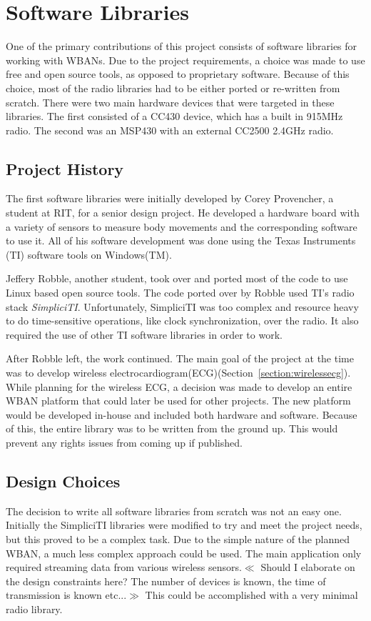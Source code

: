 \documentclass{article}
\begin{document}
\section{Software Libraries}\label{sec:wbansoftwarelib}
One of the primary contributions of this project consists of software libraries for working with WBANs. Due to the project requirements, a choice was made to use free and open source tools, as opposed to proprietary software. Because of this choice, most of the radio libraries had to be either ported or re-written from scratch. There were two main hardware devices that were targeted in these libraries. The first consisted of a CC430 device, which has a built in 915MHz radio. The second was an MSP430 with an external CC2500 2.4GHz radio.

\subsection{Project History}
The first software libraries were initially developed by Corey Provencher, a student at RIT, for a senior design project. He developed a hardware board with a variety of sensors to measure body movements and the corresponding software to use it. All of his software development was done using the Texas Instruments (TI) software tools on Windows(TM).

Jeffery Robble, another student, took over and ported most of the code to use Linux based open source tools. The code ported over by Robble used TI's radio stack \emph{SimpliciTI}. Unfortunately, SimpliciTI was too complex and resource heavy to do time-sensitive operations, like clock synchronization, over the radio. It also required the use of other TI software libraries in order to work.

After Robble left, the work continued. The main goal of the project at the time was to develop wireless electrocardiogram(ECG)(Section~\ref{section:wirelessecg}). While planning for the wireless ECG, a decision was made to develop an entire WBAN platform that could later be used for other projects. The new platform would be developed in-house and included both hardware and software. Because of this, the entire library was to be written from the ground up. This would prevent any rights issues from coming up if published.

\subsection{Design Choices}
The decision to write all software libraries from scratch was not an easy one. Initially the SimpliciTI libraries were modified to try and meet the project needs, but this proved to be a complex task. Due to the simple nature of the planned WBAN, a much less complex approach could be used. The main application only required streaming data from various wireless sensors.$\ll$ Should I elaborate on the design constraints here? The number of devices is known, the time of transmission is known etc...$\gg$ This could be accomplished with a very minimal radio library.
\end{document}
